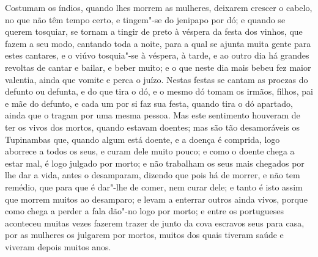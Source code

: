 \begin{linenumbers}
Costumam os índios, quando lhes morrem as mulheres, deixarem crescer o cabelo, no que não
têm tempo certo, e tingem"-se do jenipapo por dó; e quando se querem tosquiar, se tornam a
tingir de preto à véspera da festa dos vinhos, que fazem a seu modo, cantando toda a
noite, para a qual se ajunta muita gente para estes cantares, e o viúvo tosquia"-se à
véspera, à tarde, e ao outro dia há grandes revoltas de cantar e bailar, e beber muito; e
o que neste dia mais bebeu fez maior valentia, ainda que vomite e perca o juízo. Nestas
festas se cantam as proezas do defunto ou defunta, e do que tira o dó, e o mesmo dó tomam
os irmãos, filhos, pai e mãe do defunto, e cada um por si faz sua festa, quando tira o dó
apartado, ainda que o tragam por uma mesma pessoa. Mas este sentimento houveram de ter os
vivos dos mortos, quando estavam doentes; mas são tão desamoráveis os Tupinambas que,
quando algum está doente, e a doença é comprida, logo aborrece a todos os seus, e curam
dele muito pouco; e como o doente chega a estar mal, é logo julgado por morto; e não
trabalham os seus mais chegados por lhe dar a vida, antes o desamparam, dizendo que pois
há de morrer, e não tem remédio, que para que é dar"-lhe de comer, nem curar dele; e tanto
é isto assim que morrem muitos ao desamparo; e levam a enterrar outros ainda vivos, porque
como chega a perder a fala dão"-no logo por morto; e entre os portugueses aconteceu muitas
vezes fazerem trazer de junto da cova escravos seus para casa, por as mulheres os julgarem
por mortos, muitos dos quais tiveram saúde e viveram depois muitos anos.


\end{linenumbers}
